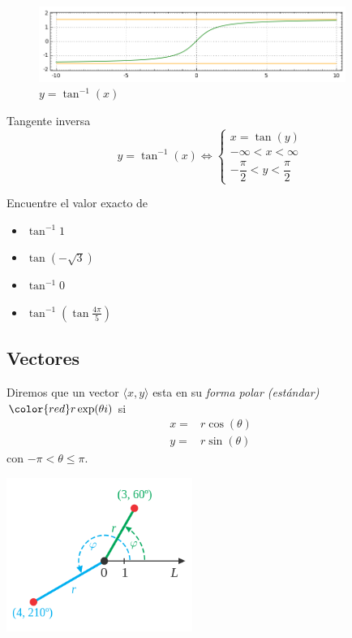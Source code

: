 {}
	\begin{figure}
		\centering
		\includegraphics[width=10cm,keepaspectratio=true]{./trig/arctan.png}
		\caption{$y=\tan^{-1}(x)$}
		\label{fig:arctan}
	\end{figure}

{Tangente inversa}
	$$y=\tan^{-1}(x)\iff
	\begin{cases}
		x=\tan(y)\\
		-\infty < x < \infty \\
		-\dfrac{\pi}{2} < y < \dfrac{\pi}{2}
	\end{cases}
	$$


{}
	\begin{problema}
		Encuentre el valor exacto de
		\begin{itemize}
			\item $\tan^{-1} 1$ 
			\item $\tan(-\sqrt{3})$ 
			\item $\tan^{-1}0$ 
			\item $\tan^{-1}\left( \tan\frac{4\pi}{5} \right)$
		\end{itemize}
		
	\end{problema}


\subsection{Vectores}
{}
	Diremos que un vector $\langle x,y \rangle$ esta en su \emph{forma polar (estándar)} ${\color{red}r\exp(\theta i)}$ si 
	\begin{align*}
		x =& r\cos(\theta)\\
		y =& r\sin(\theta)
	\end{align*} con $-\pi < \theta \leq \pi$.

{}
	\begin{center}
		\includegraphics[height=5cm,keepaspectratio=true]{./trig/Examples_of_Polar_Coordinates.png}
	\end{center}
	


